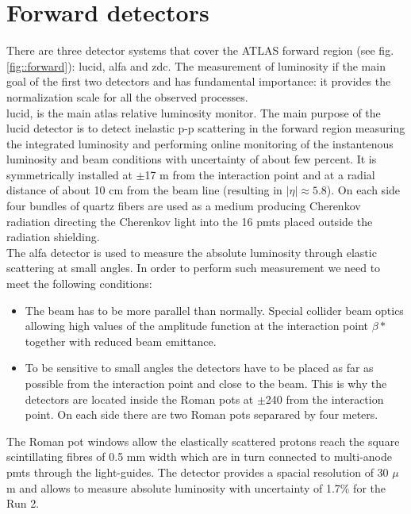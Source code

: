 \section{Forward detectors}
	There are three detector systems that cover the ATLAS forward region (see fig. \ref{fig::forward}): \gls{lucid}, \gls{alfa} and \gls{zdc}. The measurement of luminosity if the main goal of the first two detectors and has fundamental importance: it provides the normalization scale for all the observed processes.\\
	 \gls{lucid}\cite{lucid_1}, \cite{lucid_2} is the main \gls{atlas} relative luminosity monitor. The main purpose of the \gls{lucid} detector is to detect inelastic p-p scattering in the forward region measuring the integrated luminosity and performing online monitoring of the instantenous luminosity and beam conditions with uncertainty of about few percent. It is symmetrically installed at $\pm$17 m from the interaction point and at a radial distance of about 10 cm from the beam line (resulting in $|\eta| \approx 5.8$). On each side four bundles of quartz fibers are used as a medium producing Cherenkov radiation directing the Cherenkov light into the 16 \glspl{pmt} placed outside the radiation shielding. \\
	 The \gls{alfa}\cite{alfa} detector is used to measure the absolute luminosity through elastic scattering at small angles. In order to perform such measurement we need to meet the following conditions: \\
	 \begin{itemize} 
	\item  The beam has to be more parallel than normally. Special collider beam optics allowing high values of the amplitude function at the interaction point $\beta*$ together with reduced beam emittance. 
	\item  To be sensitive to small angles the detectors have to be placed as far as possible from the interaction point and close to the beam. This is why the detectors are located inside the Roman pots at $\pm$240 from the interaction point. On each side there are two Roman pots separared by four meters.
 	\end{itemize}
 	The Roman pot windows allow the elastically scattered protons reach the square scintillating fibres of 0.5 mm width which are in turn connected to multi-anode \glspl{pmt} through the light-guides. The detector provides a spacial resolution of 30 $\mu$m and allows to measure absolute luminosity with uncertainty of 1.7\% for the Run 2\cite{luminosity}. \\
